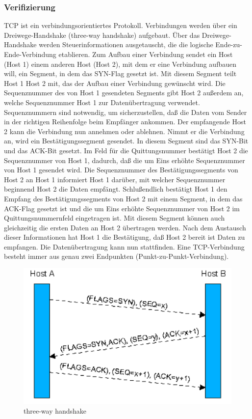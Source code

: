 \subsubsection{Verifizierung}
TCP ist ein verbindungsorientiertes Protokoll. Verbindungen werden über ein Dreiwege-Handshake (three-way handshake) aufgebaut. Über das Dreiwege-Handshake werden Steuerinformationen ausgetauscht, die die logische Ende-zu-Ende-Verbindung etablieren. Zum Aufbau einer Verbindung sendet ein Host (Host 1) einem anderen Host (Host 2), mit dem er eine Verbindung aufbauen will, ein Segment, in dem das SYN-Flag gesetzt ist. Mit diesem Segment teilt Host 1 Host 2 mit, das der Aufbau einer Verbindung gewünscht wird. Die Sequenznummer des von Host 1 gesendeten Segments gibt Host 2 außerdem an, welche Sequenznummer Host 1 zur Datenübertragung verwendet. Sequenznummern sind notwendig, um sicherzustellen, daß die Daten vom Sender in der richtigen Reihenfolge beim Empfänger ankommen. Der empfangende Host 2 kann die Verbindung nun annehmen oder ablehnen. Nimmt er die Verbindung an, wird ein Bestätigungssegment gesendet. In diesem Segment sind das SYN-Bit und das ACK-Bit gesetzt. Im Feld für die Quittungsnummer bestätigt Host 2 die Sequenznummer von Host 1, dadurch, daß die um Eins erhöhte Sequenznummer von Host 1 gesendet wird. Die Sequenznummer des Bestätigungssegments von Host 2 an Host 1 informiert Host 1 darüber, mit welcher Sequenznummer beginnend Host 2 die Daten empfängt. Schlußendlich bestätigt Host 1 den Empfang des Bestätigungssegments von Host 2 mit einem Segment, in dem das ACK-Flag gesetzt ist und die um Eins erhöhte Sequenznummer von Host 2 im Quittungsnummernfeld eingetragen ist. Mit diesem Segment können auch gleichzeitig die ersten Daten an Host 2 übertragen werden. Nach dem Austausch dieser Informationen hat Host 1 die Bestätigung, daß Host 2 bereit ist Daten zu empfangen. Die Datenübertragung kann nun stattfinden. Eine TCP-Verbindung besteht immer aus genau zwei Endpunkten (Punkt-zu-Punkt-Verbindung).
\begin{figure}
\begin{center}
    \includegraphics[scale=0.35]{images/ThreeWayHandshake.png} 
\end{center}
    \caption{three-way handshake}
    \label{img:three-way handshake}
\end{figure}
